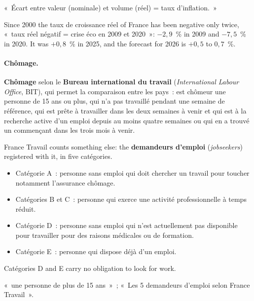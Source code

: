 \begin{remark}
  «~Écart entre valeur (nominale) et volume (réel) = taux d'inflation.~»
\end{remark}

Since 2000 the taux de croissance réel of France has been negative only twice,
«~taux réel négatif = crise éco en 2009 et 2020~»: $-2{,}9$~\% in 2009 and
$-7{,}5$~\% in 2020. It was $+0{,}8$~\% in 2025, and the forecast for 2026 is
$+0{,}5$ to $0{,}7$~\%.

\paragraph{Chômage.}

\begin{definition}
  \textbf{Chômage} selon le \textbf{Bureau international du travail}
  (\textit{International Labour Office}, BIT), qui permet la comparaison entre les
  pays~: est chômeur une personne de 15 ans ou plus, qui n'a pas travaillé
  pendant une semaine de référence, qui est prête à travailler dans les deux
  semaines à venir et qui est à la recherche active d'un emploi depuis au moins
  quatre semaines ou qui en a trouvé un commençant dans les trois mois à venir.
\end{definition}

France Travail counts something else: the \textbf{demandeurs d'emploi}
(\textit{jobseekers}) registered with it, in five catégories.
\begin{itemize}
  \item Catégorie A~: personne sans emploi qui doit chercher un travail pour
    toucher notamment l'assurance chômage.
  \item Catégories B et C~: personne qui exerce une activité professionnelle à
    temps réduit.
  \item Catégorie D~: personne sans emploi qui n'est actuellement pas disponible
    pour travailler pour des raisons médicales ou de formation.
  \item Catégorie E~: personne qui dispose déjà d'un emploi.
\end{itemize}
Catégories D and E carry no obligation to look for work.

\begin{remark}
  «~une personne de plus de 15 ans~»~; «~Les 5 demandeurs d'emploi selon France
  Travail~».
\end{remark}


